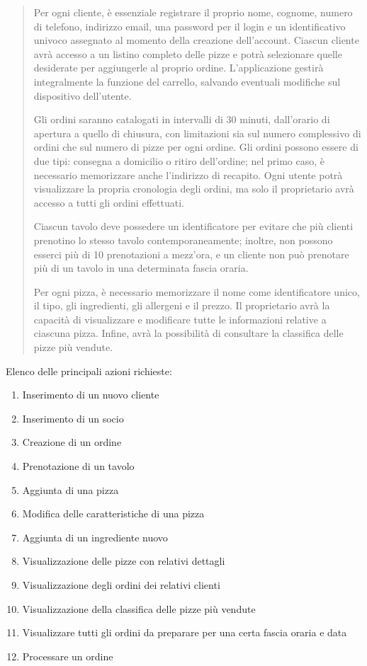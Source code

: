 \documentclass[a4paper,12pt, oneside]{article}
\begin{document}
\begin{quote}

Per ogni cliente, è essenziale registrare il proprio nome, cognome,
numero di telefono, indirizzo email, una password per il login e un
identificativo univoco assegnato al momento della creazione
dell'account. Ciascun cliente avrà accesso a un listino completo delle
pizze e potrà selezionare quelle desiderate per aggiungerle al proprio
ordine. L'applicazione gestirà integralmente la funzione del carrello,
salvando eventuali modifiche sul dispositivo dell'utente.

Gli ordini saranno catalogati in intervalli di 30 minuti,
dall'orario di apertura a quello di chiusura, con limitazioni sia sul
numero complessivo di ordini che sul numero di pizze per ogni ordine.
Gli ordini possono essere di due tipi: consegna a domicilio o ritiro
dell'ordine; nel primo caso, è necessario memorizzare anche
l'indirizzo di recapito. Ogni utente potrà visualizzare la propria
cronologia degli ordini, ma solo il proprietario avrà accesso a tutti
gli ordini effettuati.

Ciascun tavolo deve possedere un identificatore per evitare che più
clienti prenotino lo stesso tavolo contemporaneamente; inoltre, non
possono esserci più di 10 prenotazioni a mezz'ora, e un cliente non
può prenotare più di un tavolo in una determinata fascia oraria.

Per ogni pizza, è necessario memorizzare il nome come identificatore
unico, il tipo, gli ingredienti, gli allergeni e il prezzo. Il
proprietario avrà la capacità di visualizzare e modificare tutte le
informazioni relative a ciascuna pizza. Infine, avrà la possibilità
di consultare la classifica delle pizze più vendute.

\end{quote}

Elenco delle principali azioni richieste:
\begin{enumerate}
    \item Inserimento di un nuovo cliente
    \item Inserimento di un socio
    \item Creazione di un ordine
    \item Prenotazione di un tavolo
    \item Aggiunta di una pizza
    \item Modifica delle caratteristiche di una pizza
    \item Aggiunta di un ingrediente nuovo
    \item Visualizzazione delle pizze con relativi dettagli
    \item Visualizzazione degli ordini dei relativi clienti
    \item Visualizzazione della classifica delle pizze più vendute
    \item Visualizzare tutti gli ordini da preparare per una certa fascia oraria e data
    \item Processare un ordine
\end{enumerate}
\end{document}
